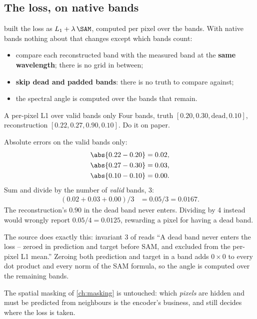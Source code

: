 \subsection{The loss, on native bands}\label{sec:specdecoder:loss}

 built the loss as $L_1 + \lambda\,\SAM$, computed per pixel over the bands. With native bands nothing about that changes except which bands count:
\begin{itemize}
\item compare each reconstructed band with the measured band at the \textbf{same wavelength}; there is no grid in between;
\item \textbf{skip dead and padded bands}: there is no truth to compare against;
\item the spectral angle is computed over the bands that remain.
\end{itemize}

\begin{worked}[label={we:specdecoder:maskedl1}]{A per-pixel L1 over valid bands only}
Four bands, truth $[0.20, 0.30, \text{dead}, 0.10]$, reconstruction $[0.22, 0.27, 0.90, 0.10]$. Do it on paper.

Absolute errors on the valid bands only:
\begin{align*}
  \abs{0.22 - 0.20} &= 0.02,\\
  \abs{0.27 - 0.30} &= 0.03,\\
  \abs{0.10 - 0.10} &= 0.00 .
\end{align*}
Sum and divide by the number of \emph{valid} bands, 3:
\begin{align*}
  (0.02 + 0.03 + 0.00)/3 &= 0.05/3 = 0.0167 .
\end{align*}
The reconstruction's $0.90$ in the dead band never enters. Dividing by 4 instead would wrongly report $0.05/4 = 0.0125$, rewarding a pixel for having a dead band.
\end{worked}

The source does exactly this: invariant 3 of  reads ``A dead band never enters the loss -- zeroed in prediction and target before SAM, and excluded from the per-pixel L1 mean.'' Zeroing both prediction and target in a band adds $0\times0$ to every dot product and every norm of the SAM formula, so the angle is computed over the remaining bands.

The spatial masking of \cref{ch:masking} is untouched: which \emph{pixels} are hidden and must be predicted from neighbours is the encoder's business, and still decides where the loss is taken.

